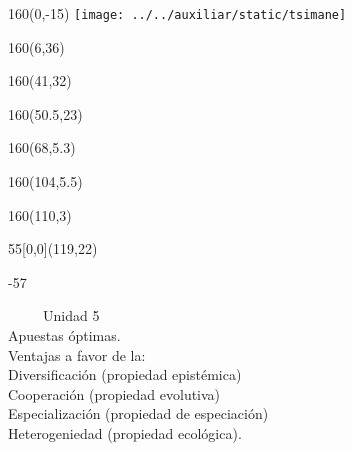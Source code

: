 \documentclass[shownotes,aspectratio=169]{beamer}
\begin{document}
\begin{frame}

\begin{textblock}{160}(0,-15)
\texttt{[image: ../../auxiliar/static/tsimane]}
\end{textblock}


\begin{textblock}{160}(6,36)
\LARGE {}
\end{textblock}
\begin{textblock}{160}(41,32)
\LARGE {}
\end{textblock}
\begin{textblock}{160}(50.5,23)
\LARGE {}
\end{textblock}
\begin{textblock}{160}(68,5.3)
\LARGE {}
\end{textblock}
\begin{textblock}{160}(104,5.5)
\LARGE {}
\end{textblock}
\begin{textblock}{160}(110,3)
\LARGE {}
\end{textblock}


\begin{textblock}{55}[0,0](119,22)
\begin{turn}{-57}
\parbox{7cm}{\sloppy\setlength\parfillskip{0pt}
\textcolor{black!0}{\ \ \ \ \ Unidad 5} \\
\small\textcolor{black!5}{\hspace{-0.15cm} Apuestas óptimas.} \\
\small\textcolor{black!5}{\hspace{-0.85cm} Ventajas a favor de la:} \\
\small\textcolor{black!5}{\hspace{-1.45cm} Diversificación (propiedad epistémica)}\\
\small\textcolor{black!5}{\hspace{-1.7cm} Cooperación (propiedad evolutiva)}\\
\small\textcolor{black!5}{ \hspace{-1.75cm}Especialización (propiedad de especiación)} \\
\small\textcolor{black!5}{\hspace{-2cm} Heterogeniedad (propiedad ecológica).\\ }}
\end{turn}
\end{textblock}


\end{frame}
\end{document}
